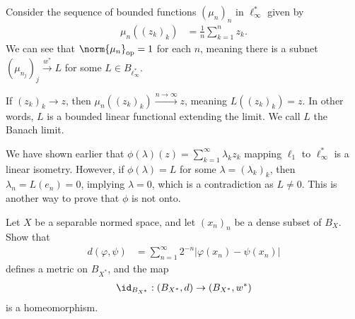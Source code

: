 \documentclass[10pt]{mypackage}
\begin{document}
\begin{example}
  Consider the sequence of bounded functions $\left(\mu_{n}\right)_n$ in $\ell_{\infty}^{\ast}$ given by
  \begin{align*}
    \mu_{n}\left(\left(z_k\right)_k\right) &= \frac{1}{n}\sum_{k=1}^{n}z_k.
  \end{align*}
  We can see that $\norm{\mu_{n}}_{\text{op}} = 1$ for each $n$, meaning there is a subnet $\left(\mu_{n_j}\right)_j\xrightarrow{w^{\ast}}L$ for some $L\in B_{\ell_{\infty}^{\ast}}$.\newline

  If $\left(z_k\right)_k\rightarrow z$, then $\mu_{n}\left(\left(z_k\right)_k\right)\xrightarrow{n\rightarrow\infty}z$, meaning $L\left(\left(z_k\right)_k\right) = z$. In other words, $L$ is a bounded linear functional extending the limit. We call $L$ the Banach limit.\newline

  We have shown earlier that $\phi\left(\lambda\right)\left(z\right) = \sum_{k=1}^{\infty}\lambda_kz_k$ mapping $\ell_1$ to $\ell_{\infty}^{\ast}$ is a linear isometry. However, if $\phi\left(\lambda\right) = L$ for some $\lambda = \left(\lambda_k\right)_k$, then $\lambda_n = L\left(e_n\right) = 0$, implying $\lambda = 0$, which is a contradiction as $L\neq 0$. This is another way to prove that $\phi$ is not onto.
\end{example}
\begin{exercise}
  Let $X$ be a separable normed space, and let $\left(x_n\right)_n$ be a dense subset of $B_{X}$. Show that
  \begin{align*}
    d\left(\varphi,\psi\right) &= \sum_{n=1}^{\infty}2^{-n}\left\vert \varphi\left(x_n\right) - \psi\left(x_n\right) \right\vert
  \end{align*}
  defines a metric on $B_{X^{\ast}}$, and the map
  \begin{align*}
    \id_{B_{X^{\ast}}}: \left(B_{X^{\ast}},d\right)\rightarrow \left(B_{X^{\ast}},w^{\ast}\right)
  \end{align*}
  is a homeomorphism.
\end{exercise}
\end{document}
